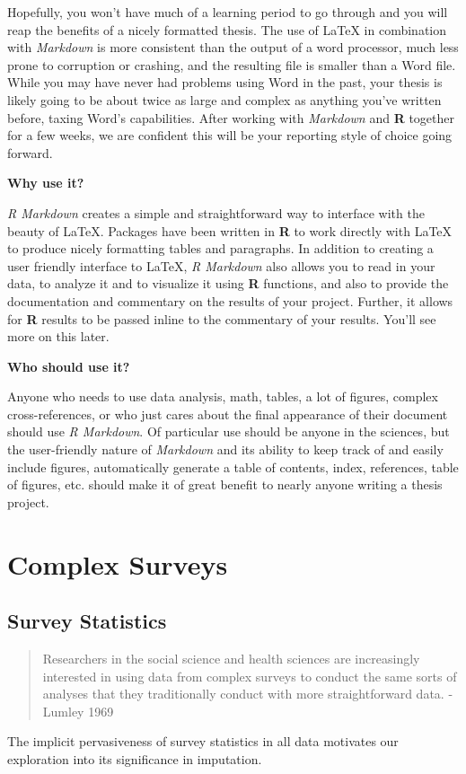 \documentclass[12pt,twoside]{reedthesis}
\begin{document}
Hopefully, you won't have much of a learning period to go through and
you will reap the benefits of a nicely formatted thesis. The use of
LaTeX in combination with \emph{Markdown} is more consistent than the
output of a word processor, much less prone to corruption or crashing,
and the resulting file is smaller than a Word file. While you may have
never had problems using Word in the past, your thesis is likely going
to be about twice as large and complex as anything you've written
before, taxing Word's capabilities. After working with \emph{Markdown}
and \textbf{R} together for a few weeks, we are confident this will be
your reporting style of choice going forward.

\textbf{Why use it?}

\emph{R Markdown} creates a simple and straightforward way to interface
with the beauty of LaTeX. Packages have been written in \textbf{R} to
work directly with LaTeX to produce nicely formatting tables and
paragraphs. In addition to creating a user friendly interface to LaTeX,
\emph{R Markdown} also allows you to read in your data, to analyze it
and to visualize it using \textbf{R} functions, and also to provide the
documentation and commentary on the results of your project. Further, it
allows for \textbf{R} results to be passed inline to the commentary of
your results. You'll see more on this later.

\textbf{Who should use it?}

Anyone who needs to use data analysis, math, tables, a lot of figures,
complex cross-references, or who just cares about the final appearance
of their document should use \emph{R Markdown}. Of particular use should
be anyone in the sciences, but the user-friendly nature of
\emph{Markdown} and its ability to keep track of and easily include
figures, automatically generate a table of contents, index, references,
table of figures, etc. should make it of great benefit to nearly anyone
writing a thesis project.

\chapter{Complex Surveys}\label{complex-surveys}

\section{Survey Statistics}\label{survey-statistics}
\begin{quote}
Researchers in the social science and health sciences are increasingly
interested in using data from complex surveys to conduct the same sorts
of analyses that they traditionally conduct with more straightforward
data. - Lumley 1969
\end{quote}
The implicit pervasiveness of survey statistics in all data motivates
our exploration into its significance in imputation.
\end{document}
